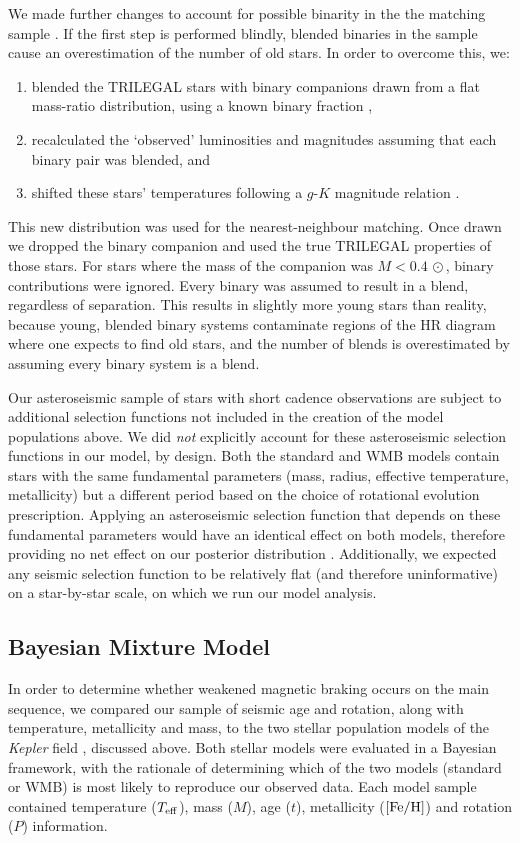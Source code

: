 \documentclass[12pt]{article}
\newcommand{\teff}{\mbox{$T_{\rm eff}$}\xspace}
\newcommand{\kepler}{\emph{Kepler}\xspace}
\begin{document}
We made further changes to account for possible binarity in the the matching sample \cite{berger+2020}. If the first step is performed blindly, blended binaries in the sample cause an overestimation of the number of old stars. In order to overcome this, we:

\begin{enumerate}
	\item blended the TRILEGAL stars with binary companions drawn from a flat mass-ratio distribution, using a known binary fraction \cite{raghavan+2010},
	\item recalculated the `observed' luminosities and magnitudes assuming that each binary pair was blended, and
	\item shifted these stars' temperatures following a $g$-$K$ magnitude relation \cite{berger+2020}.
\end{enumerate}

This new distribution was used for the nearest-neighbour matching. Once drawn we dropped the binary companion and used the true TRILEGAL properties of those stars. For stars where the mass of the companion was $M < 0.4\, \odot$, binary contributions were ignored. Every binary was assumed to result in a blend, regardless of separation. This results in slightly more young stars than reality, because young, blended binary systems contaminate regions of the HR diagram where one expects to find old stars, and the number of blends is overestimated by assuming every binary system is a blend.

Our asteroseismic sample of stars with short cadence observations are subject to additional selection functions not included in the creation of the model populations above. We did \textit{not} explicitly account for these asteroseismic selection functions in our model, by design. Both the standard and WMB models contain stars with the same fundamental parameters (mass, radius, effective temperature, metallicity) but a different period based on the choice of rotational evolution prescription. Applying an asteroseismic selection function that depends on these fundamental parameters would have an identical effect on both models, therefore providing no net effect on our posterior distribution \cite{chaplin+2011}.  Additionally, we expected any seismic selection function to be relatively flat (and therefore uninformative) on a star-by-star scale, on which we run our model analysis. 

\subsection{Bayesian Mixture Model}
In order to determine whether weakened magnetic braking occurs on the main sequence, we compared our sample of seismic age and rotation, along with temperature, metallicity and mass, to the two stellar population models of the \kepler field \cite{vansaders+2019}, discussed above. Both stellar models were evaluated in a Bayesian framework, with the rationale of determining which of the two models (standard or WMB) is most likely to reproduce our observed data. Each model sample contained temperature (\teff), mass ($M$), age ($t$), metallicity ($\rm{[Fe/H]}$) and rotation ($P$) information.
\end{document}
